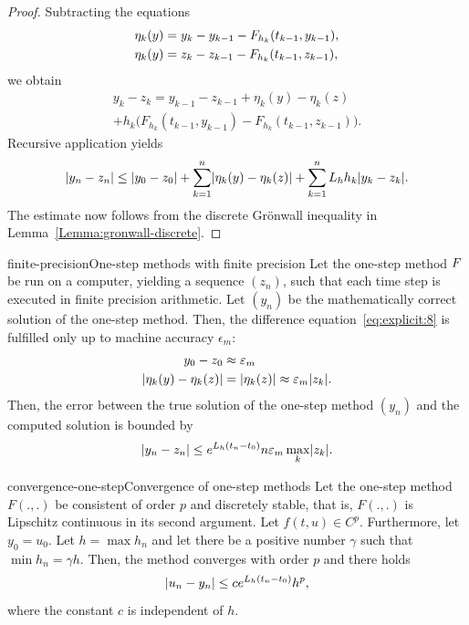 

\begin{proof}
  Subtracting the equations
  \begin{align*}
    \eta_k(y) &= y_k-y_{k-1} - F_{h_k}(t_{k-1},y_{k-1}),
    \\
    \eta_k(y) &= z_k-z_{k-1} - F_{h_k}(t_{k-1},z_{k-1}),
  \end{align*}
  we obtain
  \begin{multline*}
    y_k-z_k = y_{k-1} - z_{k-1} + \eta_k(y) - \eta_k(z)
    \\
    + h_k \bigl(
      F_{h_k}(t_{k-1},y_{k-1})-F_{h_k}(t_{k-1},z_{k-1})
    \bigr)
    .
  \end{multline*}
  Recursive application yields
  \begin{gather*}
    \lvert y_n-z_n\rvert \le \lvert y_0-z_0\rvert
    + \sum_{k=1}^n \lvert\eta_k(y)-\eta_k(z)\rvert
    + \sum_{k=1}^n L_h h_{k} \lvert y_k-z_k\rvert.
  \end{gather*}
  The estimate now follows from the discrete Grönwall inequality in
  Lemma~\ref{Lemma:gronwall-discrete}.
\end{proof}

\begin{Corollary*}{finite-precision}{One-step methods with finite precision}
  Let the one-step method $F$ be run on a computer, yielding
  a sequence $(z_n)$, such that each time step is executed in finite
  precision arithmetic. Let $(y_n)$ be the mathematically correct
  solution of the one-step method. Then, the difference
  equation~\eqref{eq:explicit:8} is fulfilled only up to machine
  accuracy $\epsilon_m$:
  \begin{align*}
    y_0-z_0 &\approx \varepsilon_m \\
    \lvert\eta_k(y) - \eta_k(z)\rvert &= \lvert\eta_k(z)\rvert \approx \varepsilon_m \lvert z_k\rvert.
  \end{align*}
  Then, the error between the true solution of the one-step method
  $(y_n)$ and the computed solution is bounded by
  \begin{gather*}
    \lvert y_n-z_n\rvert \le e^{L_h(t_n-t_0)} n \varepsilon_m \max_k\lvert z_k\rvert.
  \end{gather*}
\end{Corollary*}

\begin{Theorem*}{convergence-one-step}{Convergence of one-step methods}
  Let the one-step method $F(.,.)$ be consistent of order $p$ and
  discretely stable, that is, $F(.,.)$ is Lipschitz continuous in its
  second argument. Let $f(t,u)\in C^{p}$. Furthermore, let
  $y_0 = u_0$. Let $h = \max h_n$ and let there be a positive number
  $\gamma$ such that $\min h_n = \gamma h$. Then, the method converges
  with order $p$ and there holds
  \begin{equation}
    \label{eq:convergence-onestep:1}
    \lvert u_n - y_n\rvert \le c e^{L_h(t_n-t_0)} h^p,
  \end{equation}
  where the constant $c$ is independent of $h$.
\end{Theorem*}

